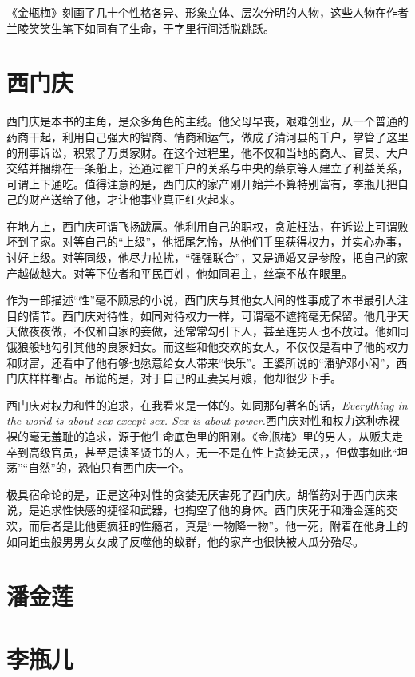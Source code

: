 《金瓶梅》刻画了几十个性格各异、形象立体、层次分明的人物，这些人物在作者兰陵笑笑生笔下如同有了生命，于字里行间活脱跳跃。

\section{西门庆}
西门庆是本书的主角，是众多角色的主线。他父母早丧，艰难创业，从一个普通的药商干起，利用自己强大的智商、情商和运气，做成了清河县的千户，掌管了这里的刑事诉讼，积累了万贯家财。在这个过程里，他不仅和当地的商人、官员、大户交结并捆绑在一条船上，还通过翟千户的关系与中央的蔡京等人建立了利益关系，可谓上下通吃。值得注意的是，西门庆的家产刚开始并不算特别富有，李瓶儿把自己的财产送给了他，才让他事业真正红火起来。

在地方上，西门庆可谓飞扬跋扈。他利用自己的职权，贪赃枉法，在诉讼上可谓败坏到了家。对等自己的“上级”，他摇尾乞怜，从他们手里获得权力，并实心办事，讨好上级。对等同级，他尽力拉扰，“强强联合”，又是通婚又是参股，把自己的家产越做越大。对等下位者和平民百姓，他如同君主，丝毫不放在眼里。

作为一部描述“性”毫不顾忌的小说，西门庆与其他女人间的性事成了本书最引人注目的情节。西门庆对待性，如同对待权力一样，可谓毫不遮掩毫无保留。他几乎天天做夜夜做，不仅和自家的妾做，还常常勾引下人，甚至连男人也不放过。他如同饿狼般地勾引其他的良家妇女。而这些和他交欢的女人，不仅仅是看中了他的权力和财富，还看中了他有够也愿意给女人带来“快乐”。王婆所说的“潘驴邓小闲”，西门庆样样都占。吊诡的是，对于自己的正妻吴月娘，他却很少下手。

西门庆对权力和性的追求，在我看来是一体的。如同那句著名的话，\emph{Everything in the world is about sex except sex. Sex is about power.}西门庆对性和权力这种赤裸裸的毫无羞耻的追求，源于他生命底色里的阳刚。《金瓶梅》里的男人，从贩夫走卒到高级官员，甚至是读圣贤书的人，无一不是在性上贪婪无厌，，但做事如此“坦荡”“自然”的，恐怕只有西门庆一个。

极具宿命论的是，正是这种对性的贪婪无厌害死了西门庆。胡僧药对于西门庆来说，是追求性快感的捷径和武器，也掏空了他的身体。西门庆死于和潘金莲的交欢，而后者是比他更疯狂的性瘾者，真是“一物降一物”。他一死，附着在他身上的如同蛆虫般男男女女成了反噬他的蚁群，他的家产也很快被人瓜分殆尽。

\section{潘金莲}

\section{李瓶儿}

